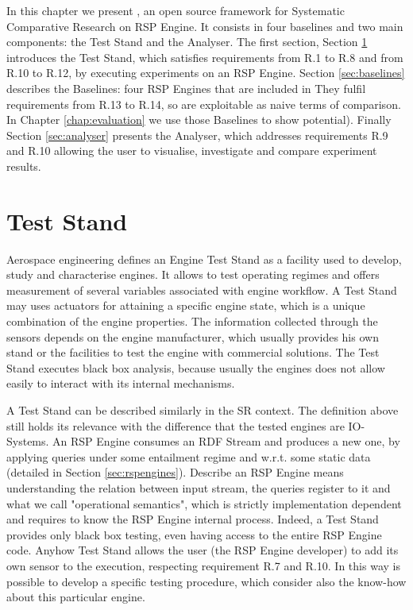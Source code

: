 In this chapter we present  \namens,  an open source framework for Systematic Comparative Research on RSP Engine.
It consists in four baselines and two main components: the Test Stand and the Analyser. The first section, Section \ref{sec:teststand} introduces the Test Stand, which satisfies requirements from R.1 to R.8 and from R.10 to R.12, by executing experiments on an RSP Engine. Section \ref{sec:baselines} describes the Baselines: four RSP Engines that are included in \name They fulfil requirements from R.13 to R.14, so are exploitable as naive terms of comparison. In Chapter \ref{chap:evaluation}  we use those Baselines to show \name potential). Finally Section \ref{sec:analyser} presents the Analyser, which addresses requirements R.9 and R.10  allowing the user to visualise, investigate and compare experiment results. %

\section{Test Stand}\label{sec:teststand}

Aerospace engineering defines an Engine Test Stand as a facility used to develop, study and characterise engines. It allows to test operating regimes and offers measurement of several variables associated with engine workflow. A Test Stand may uses actuators for attaining a specific engine state, which is a unique combination of the engine properties. The information collected through the sensors depends on the engine manufacturer, which usually provides his own stand or the facilities to test the engine with commercial solutions. The Test Stand executes black box analysis, because usually the engines does not allow easily to interact with its internal mechanisms.

A Test Stand can be described similarly in the SR context. The definition above still holds its relevance with the difference that the tested engines are IO-Systems. An RSP Engine consumes an RDF Stream and  produces a new one, by applying queries under some entailment regime and w.r.t. some static data (detailed in Section \ref{sec:rspengines}). Describe an RSP Engine means understanding the relation between input stream, the queries register to it and what we call "operational semantics", which is strictly implementation dependent and requires to know the RSP Engine internal process. Indeed, a Test Stand provides only black box testing, even having access to the entire RSP Engine code. Anyhow \name Test Stand allows the user (the RSP Engine developer) to add its own sensor to the execution, respecting requirement R.7 and R.10. In this way is possible to develop a specific testing procedure, which consider also the know-how about this particular engine.

